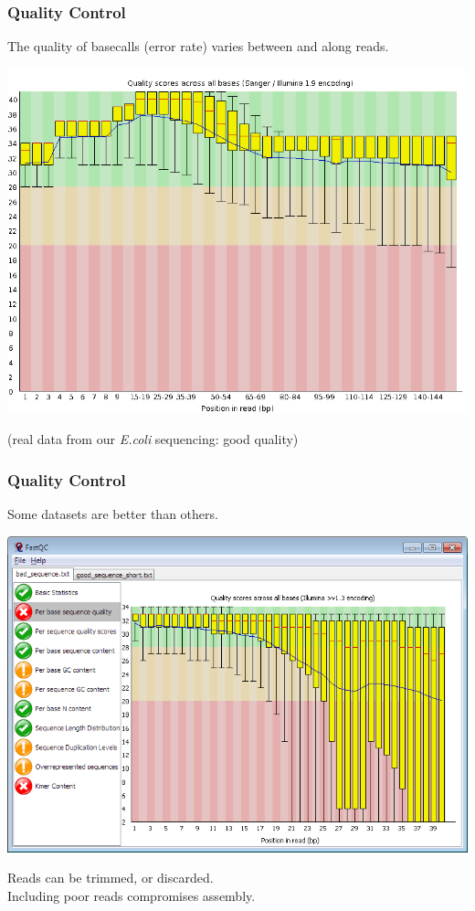 \begin{frame}[fragile]
  \frametitle{Quality Control}
  The quality of basecalls (error rate) varies between and along reads.\\
  \begin{center}
    \includegraphics[height=0.6\textheight]{images/per_base_quality}
  \end{center}  
  (real data from our \textit{E.coli} sequencing: good quality)
\end{frame}

\begin{frame}[fragile]
  \frametitle{Quality Control}
  Some datasets are better than others.\\
  \begin{center}
    \includegraphics[height=0.5\textheight]{images/fastqc}
  \end{center}  
  Reads can be trimmed, or discarded.\\
  Including poor reads compromises assembly.
\end{frame}


